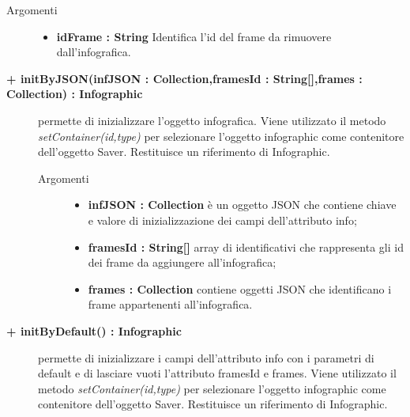 \begin{description}
\begin{description}
		\begin{description}
			\item[Argomenti] \hfill
				\begin{itemize}
				
					\item \textbf{idFrame : String			} \hfill
						Identifica l'id del frame da rimuovere dall'infografica.
				\end{itemize}
		\end{description}

\end{description}

\begin{description}
		\item[\textbf{\color{blue}+ initByJSON(infJSON : Collection,framesId : String[],frames : Collection) : Infographic			}] \hfill
			permette di inizializzare l'oggetto infografica. Viene utilizzato il metodo \textit{setContainer(id,type)} per selezionare l'oggetto infographic come contenitore dell'oggetto Saver. Restituisce un riferimento di Infographic.
			
		\begin{description}
			\item[Argomenti] \hfill
				\begin{itemize}
				
					\item \textbf{infJSON : Collection			} \hfill
					è un oggetto JSON che contiene chiave e valore di inizializzazione dei campi dell'attributo info;
					\item \textbf{framesId : String[]			} \hfill
					array di identificativi che rappresenta gli id dei frame da aggiungere all'infografica;
					\item \textbf{frames : Collection			} \hfill
					contiene oggetti JSON che identificano i frame appartenenti all'infografica. 
				\end{itemize}
		\end{description}

\end{description}

\begin{description}
		\item[\textbf{\color{blue}+ initByDefault() : Infographic			}] \hfill
			permette di inizializzare i campi dell'attributo info con i parametri di default e di lasciare vuoti l'attributo framesId e frames. Viene utilizzato il metodo \textit{setContainer(id,type)} per selezionare l'oggetto infographic come contenitore dell'oggetto Saver. Restituisce un riferimento di Infographic.


\end{description}
\end{description}
